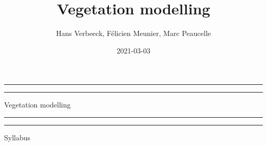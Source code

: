 \documentclass[12pt,oneside]{book}
\title{Vegetation modelling}
\author{Hans Verbeeck, Félicien Meunier, Marc Peaucelle}
\date{2021-03-03}
\begin{document}
\maketitle

\newcommand{\plogo}{\fbox{$\mathcal{PL}$}} %
\frontmatter


\begin{titlepage} %

	\centering %
	
	\scshape %
	
	\vspace*{\baselineskip} %
	
	
	\vspace{12\baselineskip}
	
	\rule{\textwidth}{1.6pt}\vspace*{-\baselineskip}\vspace*{2pt} %
	\rule{\textwidth}{0.4pt} %
	
	\vspace{0.75\baselineskip} %
	
	{\LARGE Vegetation modelling\\} %
	
	\vspace{0.75\baselineskip} %
	
	\rule{\textwidth}{0.4pt}\vspace*{-\baselineskip}\vspace{3.2pt} %
	\rule{\textwidth}{1.6pt} %
	
	\vspace{2\baselineskip} %
	
	
	Syllabus %
	
	\vspace*{3\baselineskip} %
	
	

\end{titlepage}
\end{document}

